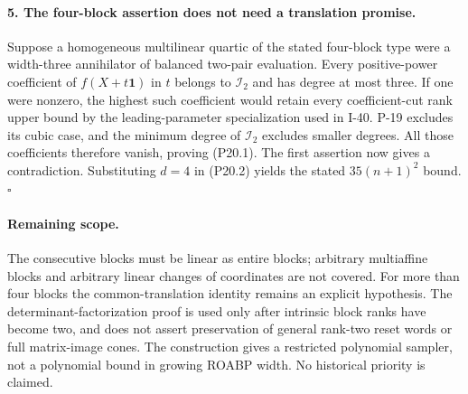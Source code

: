 \paragraph{5. The four-block assertion does not need a translation promise.}
Suppose a homogeneous multilinear quartic of the stated
four-block type were a width-three annihilator of balanced
two-pair evaluation. Every positive-power coefficient of
$f(X+t\mathbf1)$ in $t$ belongs to $\mathcal I_2$ and
has degree at most three. If one were nonzero, the highest
such coefficient would retain every coefficient-cut rank
upper bound by the leading-parameter specialization used
in I-40. P-19 excludes its cubic case, and the minimum
degree of $\mathcal I_2$ excludes smaller degrees.
All those coefficients therefore vanish, proving (P20.1).
The first assertion now gives a contradiction. Substituting
$d=4$ in (P20.2) yields the stated $35(n+1)^2$ bound.
\hfill$\square$

\paragraph{Remaining scope.}
The consecutive blocks must be linear as entire blocks;
arbitrary multiaffine blocks and arbitrary linear changes
of coordinates are not covered. For more than four blocks
the common-translation identity remains an explicit
hypothesis. The determinant-factorization proof is used
only after intrinsic block ranks have become two, and
does not assert preservation of general rank-two reset
words or full matrix-image cones. The construction gives
a restricted polynomial sampler, not a polynomial bound
in growing ROABP width. No historical priority is claimed.
